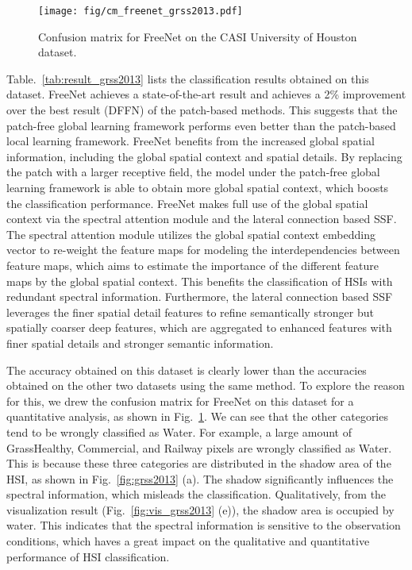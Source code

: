 \documentclass[journal]{IEEEtran}
\begin{document}
\begin{figure}[hbt]
  \centering
  \texttt{[image: fig/cm\_freenet\_grss2013.pdf]}
  \caption{Confusion matrix for FreeNet on the CASI University of Houston dataset.}
  \label{fig:cm_freenet_grss2013}
\end{figure}





Table.~\ref{tab:result_grss2013} lists the classification results obtained on this dataset.
FreeNet achieves a state-of-the-art result and achieves a 2\% improvement over the best result (DFFN) of the patch-based methods.
This suggests that the patch-free global learning framework performs even better than the patch-based local learning framework.
FreeNet benefits from the increased global spatial information, including the global spatial context and spatial details.
By replacing the patch with a larger receptive field, the model under the patch-free global learning framework is able to obtain more global spatial context, which boosts the classification performance.
FreeNet makes full use of the global spatial context via the spectral attention module and the lateral connection based SSF.
The spectral attention module utilizes the global spatial context embedding vector to re-weight the feature maps for modeling the interdependencies between feature maps, which aims to estimate the importance of the different feature maps by the global spatial context.
This benefits the classification of HSIs with redundant spectral information.
Furthermore, the lateral connection based SSF leverages the finer spatial detail features to refine semantically stronger but spatially coarser deep features, which are aggregated to enhanced features with finer spatial details and stronger semantic information.


The accuracy obtained on this dataset is clearly lower than the accuracies obtained on the other two datasets using the same method.
To explore the reason for this, we drew the confusion matrix for FreeNet on this dataset for  a quantitative analysis, as shown in Fig.~\ref{fig:cm_freenet_grss2013}.
We can see that the other categories tend to be wrongly classified as Water.
For example, a large amount of GrassHealthy, Commercial, and Railway pixels are wrongly classified as Water. 
This is because these three categories are distributed in the shadow area of the HSI, as shown in Fig.~\ref{fig:grss2013} (a).
The shadow significantly influences the spectral information, which misleads the classification.
Qualitatively, from the visualization result (Fig.~\ref{fig:vis_grss2013} (e)), the shadow area is occupied by water.
This indicates that the spectral information is sensitive to the observation conditions, which haves a great impact on the qualitative and quantitative performance of HSI classification.
\end{document}
